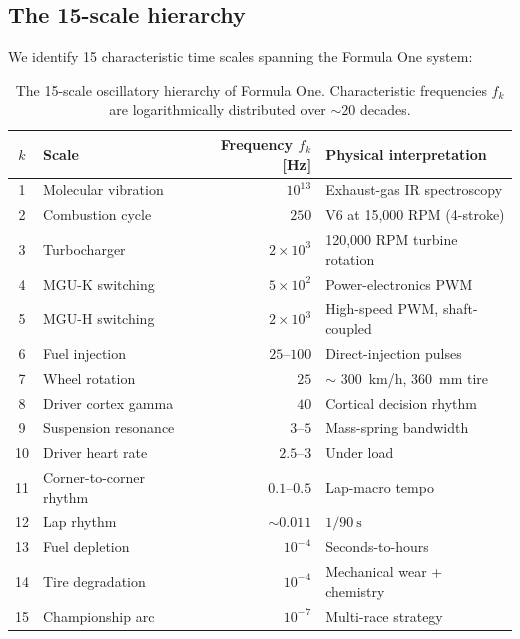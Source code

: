\documentclass[11pt,twocolumn]{article}
\theoremstyle{definition}
\theoremstyle{remark}
\begin{document}
\subsection{The 15-scale hierarchy}

We identify 15 characteristic time scales spanning the Formula One system:

\begin{table}[!t]
\centering
\caption{The 15-scale oscillatory hierarchy of Formula One. Characteristic
frequencies $f_k$ are logarithmically distributed over
$\sim 20$ decades.}
\label{tab:scales}
\begin{tabular}{clrl}
\toprule
$k$ & Scale & Frequency $f_k$ [Hz] & Physical interpretation\\
\midrule
1  & Molecular vibration         & $10^{13}$          & Exhaust-gas IR spectroscopy\\
2  & Combustion cycle            & $250$              & V6 at 15{,}000 RPM (4-stroke)\\
3  & Turbocharger                & $2\times 10^{3}$   & 120{,}000 RPM turbine rotation\\
4  & MGU-K switching             & $5\times 10^{2}$   & Power-electronics PWM\\
5  & MGU-H switching             & $2\times 10^{3}$   & High-speed PWM, shaft-coupled\\
6  & Fuel injection              & $25$--$100$        & Direct-injection pulses\\
7  & Wheel rotation              & $25$               & $\sim$ 300~km/h, 360~mm tire\\
8  & Driver cortex gamma         & $40$               & Cortical decision rhythm\\
9  & Suspension resonance        & $3$--$5$           & Mass-spring bandwidth\\
10 & Driver heart rate           & $2.5$--$3$         & Under load\\
11 & Corner-to-corner rhythm     & $0.1$--$0.5$       & Lap-macro tempo\\
12 & Lap rhythm                  & $\sim 0.011$       & $1/90~\mathrm{s}$\\
13 & Fuel depletion              & $10^{-4}$          & Seconds-to-hours\\
14 & Tire degradation            & $10^{-4}$          & Mechanical wear + chemistry\\
15 & Championship arc            & $10^{-7}$          & Multi-race strategy\\
\bottomrule
\end{tabular}
\end{table}
\end{document}
